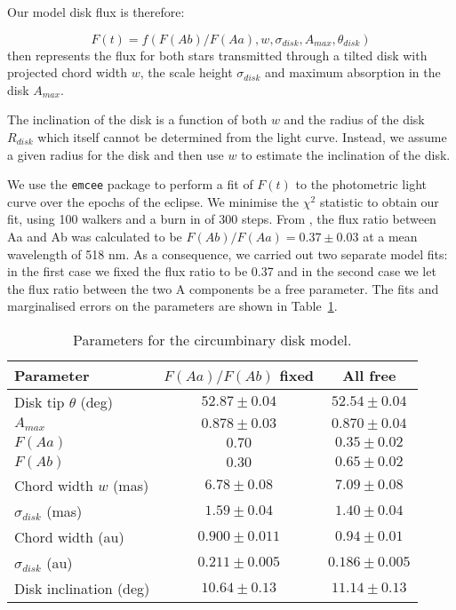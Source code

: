 \documentclass{aa}
\begin{document}
Our model disk flux is therefore:

$$F(t) = f( F(Ab)/F(Aa), w, \sigma_{disk}, A_{max}, \theta_{disk})$$ then represents the flux for both stars transmitted through a tilted disk with projected chord width $w$, the scale height $\sigma_{disk}$ and maximum absorption in the disk $A_{max}$.

The inclination of the disk is a function of both $w$ and the radius of the disk $R_{disk}$ which itself cannot be determined from the light curve.
%
Instead, we assume a given radius for the disk and then use $w$ to estimate the inclination of the disk.

We use the {\tt emcee} package to perform a fit of $F(t)$ to the photometric light curve over the epochs of the eclipse.
%
We minimise the $\chi^2$ statistic to obtain our fit, using 100 walkers and a burn in of 300 steps.
%
From \citet{Boden07}, the flux ratio between Aa and Ab was calculated to be $F(Ab)/F(Aa)=0.37\pm 0.03$ at a mean wavelength of 518 nm.
%
As a consequence, we carried out two separate model fits:
in the first case we fixed the flux ratio to be 0.37 and in the second case we let the flux ratio between the two A components be a free parameter.
%
The fits and marginalised errors on the parameters are shown in Table~\ref{tab:diskparams}.

\begin{table}
\caption{Parameters for the circumbinary disk model.}
\label{tab:diskparams}
\centering
\begin{tabular}{l c c}
\hline\hline 
Parameter                   & $F(Aa)/F(Ab)$ fixed          & All free \\
\hline 
Disk tip $\theta$ (deg)   & $52.87 \pm 0.04$    & $52.54 \pm 0.04$ \\
$A_{max}$                   & $0.878 \pm 0.03$    & $0.870 \pm 0.04$ \\
$F(Aa)$                     & $0.70$              & $0.35 \pm 0.02$ \\
$F(Ab)$                     & $0.30$              & $0.65 \pm 0.02$ \\
Chord width $w$ (mas)       & $6.78 \pm 0.08$     & $7.09 \pm 0.08$ \\
$\sigma_{disk}$ (mas)       & $1.59 \pm 0.04$     & $1.40 \pm 0.04$   \\
\hline
Chord width (au)         &   $0.900\pm0.011$ & $0.94\pm 0.01$             \\
$\sigma_{disk}$ (au)         &   $0.211\pm 0.005$ & $0.186\pm 0.005$             \\
Disk inclination (deg) &             $10.64\pm0.13$          &     $11.14\pm0.13$       \\
%
\hline                                             %
\end{tabular}
\end{table}
\end{document}
